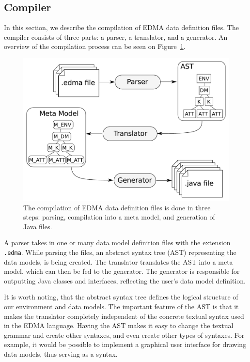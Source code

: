 
\subsection{Compiler}

In this section, we describe the compilation of EDMA data definition
files. The compiler consists of three parts: a parser, a translator,
and a generator. An overview of the compilation process can be seen
on Figure~\ref{fig:compilation}.

\begin{figure}[h]
	\centering
	\includegraphics[scale=0.5]{img/compilation.pdf}
	\caption{The compilation of EDMA data definition files is done in three steps: parsing, compilation into a meta model, and generation of Java files.}
	\label{fig:compilation}
\end{figure}

A parser takes in one or many data model definition files with the
extension \texttt{.edma}. While parsing the files, an abstract syntax
tree (AST) representing the data models, is being created. The translator
translates the AST into a meta model, which can then be fed to the
generator. The generator is responsible for outputting Java classes
and interfaces, reflecting the user's data model definition.

It is worth noting, that the abstract syntax tree defines the logical
structure of our environment and data models. The important feature
of the AST is that it makes the translator completely independent
of the concrete textual syntax used in the EDMA language. Having the
AST makes it easy to change the textual grammar and create other syntaxes,
and even create other types of syntaxes. For example, it would be
possible to implement a graphical user interface for drawing data
models, thus serving as a syntax.


